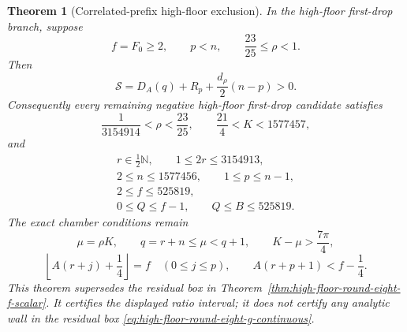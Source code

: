 \documentclass[11pt]{article}
\newtheorem{theorem}{Theorem}[section]
\theoremstyle{remark}
\newcommand{\N}{\mathbb N}
\begin{document}
\begin{theorem}[Correlated-prefix high-floor exclusion]
\label{thm:high-floor-round-eight-g-scalar}
In the high-floor first-drop branch, suppose
\[
 f=F_0\geq2,\qquad p<n,\qquad
 \frac{23}{25}\leq\rho<1.
\]
Then
\begin{equation}
 \boxed{
 \mathcal S=D_A(q)+R_p+\frac{d_\rho}{2}(n-p)>0.}
 \label{eq:high-floor-round-eight-g-positive}
\end{equation}
Consequently every remaining negative high-floor first-drop candidate
satisfies
\begin{equation}
 \boxed{
 \frac1{3154914}<\rho<\frac{23}{25},\qquad
 \frac{21}{4}<K<1577457,}
 \label{eq:high-floor-round-eight-g-continuous}
\end{equation}
and
\begin{equation}
 \boxed{
 \begin{gathered}
 r\in\tfrac12\N,\qquad 1\leq2r\leq3154913,\\
 2\leq n\leq1577456,\qquad 1\leq p\leq n-1,\\
 2\leq f\leq525819,\\
 0\leq Q\leq f-1,\qquad Q\leq B\leq525819.
 \end{gathered}}
 \label{eq:high-floor-round-eight-g-discrete}
\end{equation}
The exact chamber conditions remain
\begin{equation}
 \mu=\rho K,\qquad q=r+n\leq\mu<q+1,\qquad
 K-\mu>\frac{7\pi}{4},
 \label{eq:high-floor-round-eight-g-chamber-one}
\end{equation}
\begin{equation}
 \left\lfloor A(r+j)+\frac14\right\rfloor=f
 \quad(0\leq j\leq p),\qquad
 A(r+p+1)<f-\frac14.
 \label{eq:high-floor-round-eight-g-chamber-two}
\end{equation}
This theorem supersedes the residual box in
Theorem~\ref{thm:high-floor-round-eight-f-scalar}.  It certifies the
displayed ratio interval; it does not certify any analytic wall in the
residual box \eqref{eq:high-floor-round-eight-g-continuous}.
\end{theorem}
\end{document}
